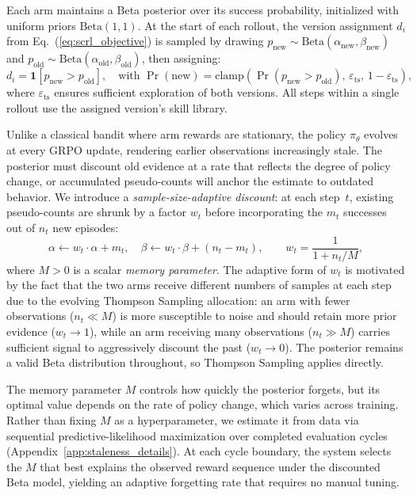 \documentclass{article}
\theoremstyle{plain}
\theoremstyle{definition}
\theoremstyle{remark}
\begin{document}
Each arm maintains a Beta posterior over its success probability, initialized with uniform priors $\text{Beta}(1, 1)$. At the start of each rollout, the version assignment $d_i$ from Eq.~(\ref{eq:scrl_objective}) is sampled by drawing $p_{\text{new}} \sim \text{Beta}(\alpha_{\text{new}}, \beta_{\text{new}})$ and $p_{\text{old}} \sim \text{Beta}(\alpha_{\text{old}}, \beta_{\text{old}})$, then assigning:
\begin{equation}
    d_i = \mathbf{1}[p_{\text{new}} > p_{\text{old}}], \quad \text{with } \Pr(\text{new}) = \text{clamp}\!\left(\Pr(p_{\text{new}} > p_{\text{old}}),\, \varepsilon_{\text{ts}},\, 1{-}\varepsilon_{\text{ts}}\right),
    \label{eq:thompson_decision}
\end{equation}
where $\varepsilon_{\text{ts}}$ ensures sufficient exploration of both versions. All steps within a single rollout use the assigned version's skill library.

Unlike a classical bandit where arm rewards are stationary, the policy $\pi_\theta$ evolves at every GRPO update, rendering earlier observations increasingly stale. The posterior must discount old evidence at a rate that reflects the degree of policy change, or accumulated pseudo-counts will anchor the estimate to outdated behavior. We introduce a \textit{sample-size-adaptive discount}: at each step~$t$, existing pseudo-counts are shrunk by a factor $w_t$ before incorporating the $m_t$ successes out of $n_t$ new episodes:
\begin{equation}
    \alpha \leftarrow w_t \cdot \alpha + m_t, \quad \beta \leftarrow w_t \cdot \beta + (n_t - m_t), \qquad w_t = \frac{1}{1 + n_t/M},
    \label{eq:beta_update}
\end{equation}
where $M > 0$ is a scalar \emph{memory parameter}. The adaptive form of $w_t$ is motivated by the fact that the two arms receive different numbers of samples at each step due to the evolving Thompson Sampling allocation: an arm with fewer observations ($n_t \ll M$) is more susceptible to noise and should retain more prior evidence ($w_t \to 1$), while an arm receiving many observations ($n_t \gg M$) carries sufficient signal to aggressively discount the past ($w_t \to 0$). The posterior remains a valid Beta distribution throughout, so Thompson Sampling applies directly.

The memory parameter $M$ controls how quickly the posterior forgets, but its optimal value depends on the rate of policy change, which varies across training. Rather than fixing $M$ as a hyperparameter, we estimate it from data via sequential predictive-likelihood maximization over completed evaluation cycles (Appendix~\ref{app:staleness_details}). At each cycle boundary, the system selects the $M$ that best explains the observed reward sequence under the discounted Beta model, yielding an adaptive forgetting rate that requires no manual tuning.
\end{document}
